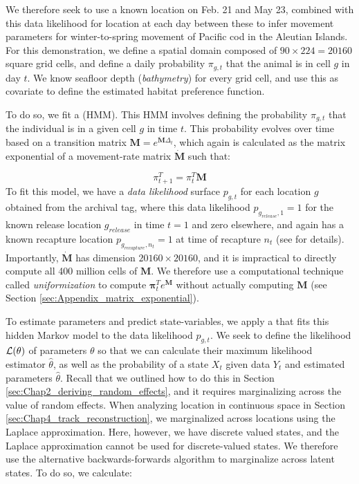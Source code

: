 We therefore seek to use a known location on Feb. 21 and May 23, combined with this data likelihood for location at each day between these to infer movement parameters for winter-to-spring movement of Pacific cod in the Aleutian Islands.  For this demonstration, we  define a spatial domain composed of \( 90 \times 224 = 20160 \) square grid cells, and define a daily probability \( \pi_{g,t} \) that the animal is in cell \(g\) in day \(t\).  We know seafloor depth (\textit{bathymetry}) for every grid cell, and use this as covariate to define the estimated habitat preference function.  

To do so, we fit a  (HMM).  This HMM involves defining the probability \( \pi_{g,t} \) that the individual is in a given cell \(g\) in time \(t\).  This probability evolves over time based on a transition matrix \(\mathbf{M} = e^{\dot{\mathbf{M}} \Delta_t}\), which again is calculated as the matrix exponential of a movement-rate matrix \( \dot{\mathbf{M}} \) such that:

\begin{equation}
    \pi_{t+1}^T = \pi_{t}^T \mathbf{M} 
\end{equation}
To fit this model, we have a \textit{data likelihood} surface \( p_{g,t} \) for each location \(g\) obtained from the archival tag, where this data likelihood \( p_{g_{release},1}=1 \) for the known release location \( g_{release} \) in time \(t=1\) and zero elsewhere, and again has a known recapture location \( p_{g_{recapture},n_t} = 1 \) at time of recapture \( n_t \) (see \cite{pedersen_geolocation_2008} for details).  Importantly, \( \dot{\mathbf{M}} \) has dimension \(20160 \times 20160\), and it is impractical to directly compute all 400 million cells of \( \mathbf{M} \).  We therefore use a computational technique called \textit{uniformization} \cite{grassmann_transient_1977,sherlock_direct_2021} to compute \( \mathbf{\pi}_{t}^T e^{\dot{\mathbf{M}}} \) without actually computing \( \mathbf{M} \) (see Section \ref{sec:Appendix_matrix_exponential}).

To estimate parameters and predict state-variables, we apply a  that fits this hidden Markov model to the data likelihood \( p_{g,t} \).  We seek to define the likelihood \(\operatorname{\mathcal{L}}(\theta)\) of parameters \(\theta\) so that we can calculate their maximum likelihood estimator \(\hat{\theta}\), as well as the probability of a state \(X_t\) given data \(Y_t\) and estimated parameters \(\hat{\theta}\).  Recall that we outlined how to do this in Section \ref{sec:Chap2_deriving_random_effects}, and it requires marginalizing across the value of random effects.  When analyzing location in continuous space in Section \ref{sec:Chap4_track_reconstruction}, we marginalized across locations using the Laplace approximation. Here, however, we have discrete valued states, and the Laplace approximation cannot be used for discrete-valued states.  We therefore use the alternative backwards-forwards algorithm to marginalize across latent states.  To do so, we calculate:

